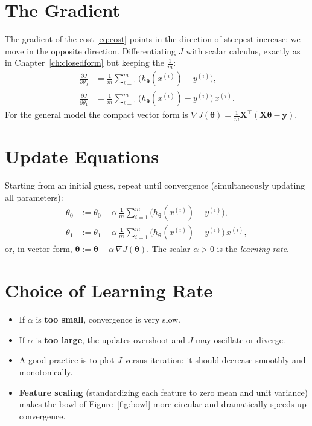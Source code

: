 \documentclass[11pt,a4paper]{report}
\theoremstyle{definition}
\theoremstyle{plain}
\theoremstyle{remark}
\newcommand{\vy}{\mathbf{y}}
\newcommand{\vw}{\bm{\theta}}          %
\newcommand{\Xmat}{\mathbf{X}}
\newcommand{\htheta}{h_{\bm{\theta}}}
\begin{document}
	\section{The Gradient}
	The gradient of the cost \eqref{eq:cost} points in the direction of steepest
	increase; we move in the opposite direction. Differentiating $J$ with scalar
	calculus, exactly as in Chapter~\ref{ch:closedform} but keeping the $\tfrac1m$:
	\begin{align}
		\frac{\partial J}{\partial\theta_0}
		&=\frac1m\sum_{i=1}^{m}\bigl(\htheta(x^{(i)})-y^{(i)}\bigr),
		\label{eq:grad0}\\[4pt]
		\frac{\partial J}{\partial\theta_1}
		&=\frac1m\sum_{i=1}^{m}\bigl(\htheta(x^{(i)})-y^{(i)}\bigr)\,x^{(i)} .
		\label{eq:grad1}
	\end{align}
	For the general model the compact vector form is
	$\nabla J(\vw)=\frac1m\Xmat^{\!\top}(\Xmat\vw-\vy)$.
	
	\section{Update Equations}
	Starting from an initial guess, repeat until convergence (simultaneously
	updating all parameters):
	\begin{equation}
		\boxed{\;
			\begin{aligned}
				\theta_0 &:= \theta_0-\alpha\,\frac1m\sum_{i=1}^{m}\bigl(\htheta(x^{(i)})-y^{(i)}\bigr),\\[3pt]
				\theta_1 &:= \theta_1-\alpha\,\frac1m\sum_{i=1}^{m}\bigl(\htheta(x^{(i)})-y^{(i)}\bigr)\,x^{(i)},
			\end{aligned}\;}
		\label{eq:gdupdate}
	\end{equation}
	or, in vector form, $\vw:=\vw-\alpha\,\nabla J(\vw)$. The scalar $\alpha>0$ is
	the \emph{learning rate}.
	
	\section{Choice of Learning Rate}
	\begin{itemize}[nosep]
		\item If $\alpha$ is \textbf{too small}, convergence is very slow.
		\item If $\alpha$ is \textbf{too large}, the updates overshoot and $J$ may
		oscillate or diverge.
		\item A good practice is to plot $J$ versus iteration: it should decrease
		smoothly and monotonically.
		\item \textbf{Feature scaling} (standardizing each feature to zero mean and
		unit variance) makes the bowl of Figure~\ref{fig:bowl} more circular
		and dramatically speeds up convergence.
	\end{itemize}
	
\end{document}
